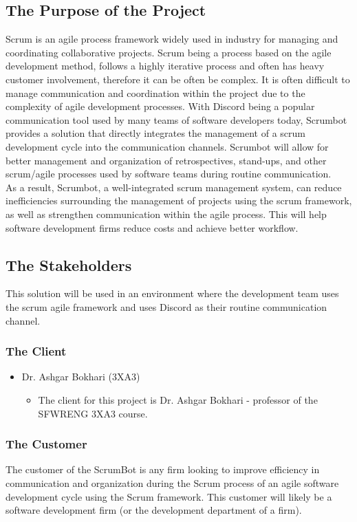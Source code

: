 \documentclass[12pt, titlepage]{article}
\begin{document}
\subsection{The Purpose of the Project}
Scrum is an agile process framework widely used in industry for managing and coordinating collaborative projects. Scrum being a process based on the agile development method, follows a highly iterative process and often has heavy customer involvement, therefore it can be often be complex. It is often difficult to manage communication and coordination within the project due to the complexity of agile development processes. With Discord being a popular communication tool used by many teams of software developers today, Scrumbot provides a solution that directly integrates the management of a scrum development cycle into the communication channels. Scrumbot will allow for better management and organization of retrospectives, stand-ups, and other scrum/agile processes used by software teams during routine communication.\\

As a result, Scrumbot, a well-integrated scrum management system, can reduce inefficiencies surrounding the management of projects using the scrum framework, as well as strengthen communication within the agile process. This will help software development firms reduce costs and achieve better workflow.

\subsection{The Stakeholders}
This solution will be used in an environment where the development team uses the scrum agile framework and uses Discord as their routine communication channel.

\subsubsection{The Client}
\begin{itemize}
    \item Dr. Ashgar Bokhari (3XA3)
    \begin{itemize}
      \item[] The client for this project is Dr. Ashgar Bokhari - professor of the SFWRENG 3XA3 course.
    \end{itemize}
\end{itemize}

\subsubsection{The Customer}
The customer of the ScrumBot is any firm looking to improve efficiency in communication and organization during the Scrum process of an agile software development cycle using the Scrum framework. This customer will likely be a software development firm (or the development department of a firm).
\end{document}
